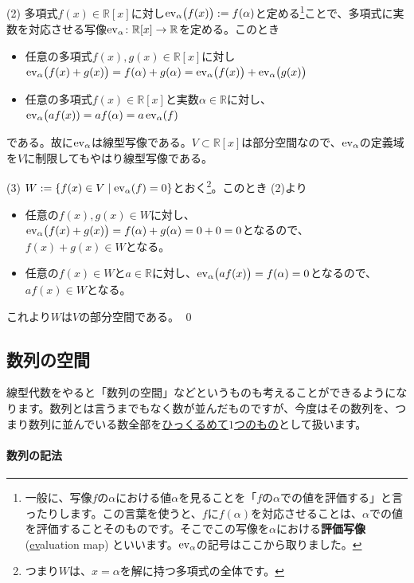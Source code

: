 \noindent (2) 多項式$f(x)\in\mathbb{R}[x]$に対し$\operatorname{ev}_{\alpha}\bigl(f(x)\bigr) := f(\alpha)$と定める\footnote{一般に、写像$f$の$\alpha$における値$\alpha$を見ることを「$f$の$\alpha$での値を評価する」と言ったりします。この言葉を使うと、$f$に$f(\alpha)$を対応させることは、$\alpha$での値を評価することそのものです。そこでこの写像を$\alpha$における\textbf{評価写像} (\underline{ev}aluation map) といいます。$\operatorname{ev}_{\alpha}$の記号はここから取りました。}ことで、多項式に実数を対応させる写像$\operatorname{ev}_{\alpha}\colon\mathbb{R}[x]\rightarrow\mathbb{R}$を定める。このとき
\begin{itemize}
\item 任意の多項式$f(x), g(x) \in\mathbb{R}[x]$に対し$\operatorname{ev}_{\alpha}\bigl(f(x)+g(x)\bigr) = f(\alpha) + g(\alpha) = \operatorname{ev}_{\alpha}\bigl(f(x)\bigr) + \operatorname{ev}_{\alpha}\bigl(g(x)\bigr)$
\item 任意の多項式$f(x)\in\mathbb{R}[x]$と実数$\alpha\in\mathbb{R}$に対し、$\operatorname{ev}_{\alpha}\bigl(af(x)) = a f(\alpha) = a \operatorname{ev}_{\alpha}(f)$
\end{itemize}
である。故に$\operatorname{ev}_{\alpha}$は線型写像である。$V\subset\mathbb{R}[x]$は部分空間なので、$\operatorname{ev}_{\alpha}$の定義域を$V$に制限してもやはり線型写像である。

\noindent (3) $W := \{f(x) \in V \mid \operatorname{ev}_{\alpha}(f) = 0\}$とおく\footnote{つまり$W$は、$x = \alpha$を解に持つ多項式の全体です。}。このとき (2)より
\begin{itemize}
\item 任意の$f(x), g(x)\in W$に対し、$\operatorname{ev}_{\alpha}\bigl(f(x) + g(x)\bigr) = f(\alpha) + g(\alpha) = 0 + 0 = 0$となるので、$f(x) + g(x) \in W$となる。
\item 任意の$f(x) \in W$と$a\in\mathbb{R}$に対し、$\operatorname{ev}_{\alpha}\bigl(a f(x)\bigr) = f(\alpha) = 0$となるので、$af(x)\in W$となる。
\end{itemize}
これより$W$は$V$の部分空間である。 \qed

\subsection{数列の空間}

線型代数をやると「数列の空間」などというものも考えることができるようになります。数列とは言うまでもなく数が並んだものですが、今度はその数列を、つまり数列に並んでいる数全部を\uline{ひっくるめて$1$つのもの}として扱います。

\paragraph{数列の記法}

